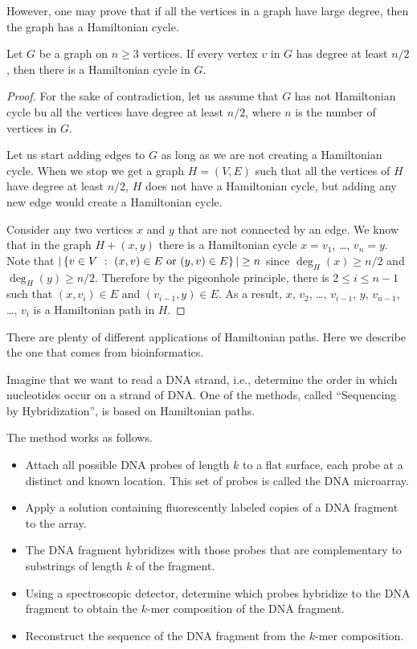 However, one may prove that if all the vertices in a graph have large degree,
then the graph has a Hamiltonian cycle.
\begin{theorem}[Dirac]
  Let $G$ be a graph on $n \ge 3$ vertices. If every vertex $v$ in $G$ has
  degree at least $n / 2$, then there is a Hamiltonian cycle in $G$.
\end{theorem}
\begin{proof}
  For the sake of contradiction, let us assume that $G$ has not Hamiltonian
  cycle bu all the vertices have degree at least $n / 2$, where $n$ is
  the number of vertices in $G$.

  Let us start adding edges to $G$ as long as we are not creating a
  Hamiltonian cycle. When we stop we get a graph $H = (V, E)$ such that
  all the vertices of $H$ have degree at least $n / 2$, $H$ does
  not have a Hamiltonian cycle, but adding any new edge would create a
  Hamiltonian cycle.

  Consider any two vertices $x$ and $y$ that are not connected by
  an edge. We know that in the graph $H + (x, y)$ there is
  a Hamiltonian cycle $x = v_1$, \dots, $v_n = y$. Note that
  $|\set[{(x, v) \in E \text{ or } (y, v) \in E}]{v \in V}| \ge n$
  since $\deg_H(x) \ge n / 2$ and $\deg_H(y) \ge n / 2$.
  Therefore by the pigeonhole principle, there is $2 \le i \le n - 1$
  such that $(x, v_i) \in E$ and $(v_{i - 1}, y) \in E$. As a result,
  $x$, $v_2$, \dots, $v_{i - 1}$, $y$, $v_{n - 1}$, \dots, $v_i$
  is a Hamiltonian path in $H$.
\end{proof}

There are plenty of different applications of Hamiltonian paths. Here we describe
the one that comes from bioinformatics.

Imagine that we want to read a DNA strand, i.e., determine the order in which
nucleotides occur on a strand of DNA. One of the methods, called
``Sequencing by Hybridization'', is based on Hamiltonian paths.

The method works as follows.
\begin{itemize}
  \item Attach all possible DNA probes of length $k$ to a flat surface, each
    probe at a distinct and known location. This set of probes is called
    the DNA microarray.
  \item Apply a solution containing fluorescently labeled copies of a DNA
    fragment to the array.
  \item The DNA fragment hybridizes with those probes that are
    complementary to substrings of length $k$ of the fragment.
  \item Using a spectroscopic detector, determine which probes hybridize to
    the DNA fragment to obtain the $k$-mer composition of the DNA fragment.
  \item Reconstruct the sequence of the DNA fragment from the $k$-mer
    composition.
\end{itemize}

